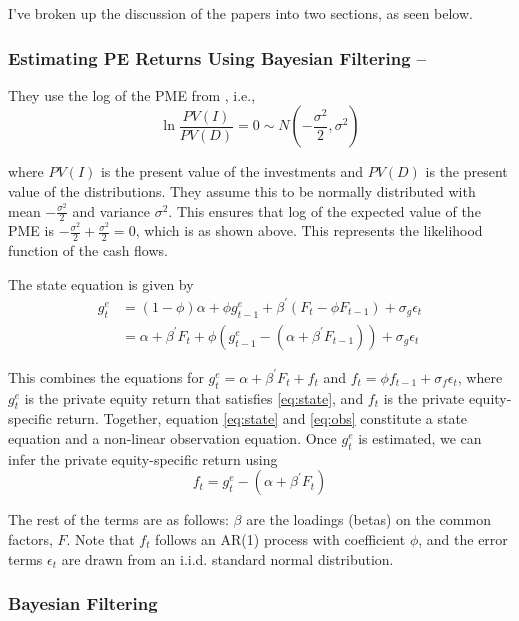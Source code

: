 \documentclass[final,5p,times,twocolumn,authoryear]{elsarticle}
\begin{document}
I've broken up the discussion of the papers into two sections, as seen below.

\subsubsection{Estimating PE Returns Using Bayesian Filtering --  \cite{Ang2014}}


They use the log of the PME from \cite{Kaplan2005}, i.e.,
\begin{equation}
\label{eq:state}
	\ln \frac{PV(I)}{PV(D)} = 0 \sim N(-\frac{\sigma^2}{2}, \sigma^2)
\end{equation}

where $PV(I)$ is the present value of the investments and $PV(D)$ is the present value of the distributions. They assume this to be normally distributed with mean $-\frac{\sigma^2}{2}$ and variance $\sigma^2$. This ensures that log of the expected value of the PME is $-\frac{\sigma^2}{2} + \frac{\sigma^2}{2} = 0$, which is as shown above. This represents the likelihood function of the cash flows. 

The state equation is given by
\begin{align}
	g_t^e 	&= ( 1 - \phi ) \alpha + \phi g_{t-1}^e + \beta^\prime \left( F_t - \phi F_{t-1} \right) + \sigma_g \epsilon_t	\label{eq:obs} \\
			&= \alpha + \beta^\prime F_t + \phi \left( g_{t-1}^e - (\alpha + \beta^\prime F_{t-1} ) \right) + \sigma_g \epsilon_t
\end{align}

This combines the equations for $g_t^e = \alpha + \beta^\prime F_t + f_t$ and $f_t = \phi f_{t-1} + \sigma_f \epsilon_t$, where $g_t^e$ is the private equity return that satisfies \eqref{eq:state}, and $f_t$ is the private equity-specific return. Together, equation \eqref{eq:state} and \eqref{eq:obs} constitute a state equation and a non-linear observation equation. Once $g_t^e$ is estimated, we can infer the private equity-specific return using
\begin{equation}
	f_t = g_t^e - ( \alpha + \beta^\prime F_t )
\end{equation}

The rest of the terms are as follows: $\beta$ are the loadings (betas) on the common factors, $F$. Note that $f_t$ follows an AR(1) process with coefficient $\phi$, and the error terms $\epsilon_t$ are drawn from an i.i.d. standard normal distribution.

\subsubsection{Bayesian Filtering}
\end{document}
